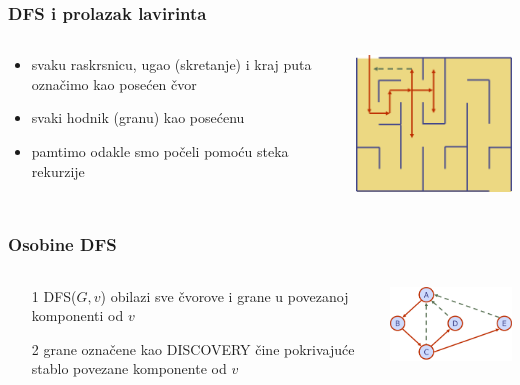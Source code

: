 \documentclass[compress]{beamer}
\begin{document}
\begin{frame}[fragile]
  \frametitle{DFS i prolazak lavirinta}
  \begin{columns}
    \begin{column}[t]{6cm}
      \begin{itemize}
        \item svaku raskrsnicu, ugao (skretanje) i kraj puta označimo
          kao posećen čvor
        \item svaki hodnik (granu) kao posećenu
        \item pamtimo odakle smo počeli pomoću steka rekurzije
      \end{itemize}
    \end{column}
    \begin{column}[t]{6cm}
      \begin{center}
        \includegraphics[width=6cm]{asp-14-pic20.png}
      \end{center}
    \end{column}
  \end{columns}
\end{frame}

\begin{frame}[fragile]
  \frametitle{Osobine DFS}
  \begin{columns}
    \begin{column}[t]{6cm}
      \begin{itemize}
        \item[1] DFS($G,v$) obilazi sve čvorove i grane u povezanoj 
          komponenti od $v$
        \item[2] grane označene kao {\scriptsize DISCOVERY} čine 
          pokrivajuće stablo povezane komponente od $v$
      \end{itemize}
    \end{column}
    \begin{column}[t]{6cm}
      \begin{center}
        \includegraphics[width=5cm]{asp-14-pic21.png}
      \end{center}
    \end{column}
  \end{columns}
\end{frame}
\end{document}
